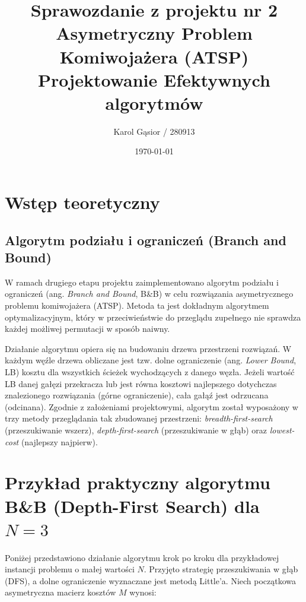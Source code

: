 \documentclass[12pt, a4paper]{article}
\title{\textbf{Sprawozdanie z projektu nr 2} \\ \large Asymetryczny Problem Komiwojażera (ATSP)
	\\ \large Projektowanie Efektywnych algorytmów}
\author{Karol Gąsior / 280913}
\date{\today}
\begin{document}
	
	\maketitle %
	\newpage
	\tableofcontents %
	\newpage
	
	\section{Wstęp teoretyczny}
	
	\subsection{Algorytm podziału i ograniczeń (Branch and Bound)}
	W ramach drugiego etapu projektu zaimplementowano algorytm podziału i ograniczeń (ang. \textit{Branch and Bound}, B\&B) w celu rozwiązania asymetrycznego problemu komiwojażera (ATSP). Metoda ta jest dokładnym algorytmem optymalizacyjnym, który w przeciwieństwie do przeglądu zupełnego nie sprawdza każdej możliwej permutacji w sposób naiwny. 
	
	Działanie algorytmu opiera się na budowaniu drzewa przestrzeni rozwiązań. W każdym węźle drzewa obliczane jest tzw. dolne ograniczenie (ang. \textit{Lower Bound}, LB) kosztu dla wszystkich ścieżek wychodzących z danego węzła. Jeżeli wartość LB danej gałęzi przekracza lub jest równa kosztowi najlepszego dotychczas znalezionego rozwiązania (górne ograniczenie), cała gałąź jest odrzucana (odcinana). Zgodnie z założeniami projektowymi, algorytm został wyposażony w trzy metody przeglądania tak zbudowanej przestrzeni: \textit{breadth-first-search} (przeszukiwanie wszerz), \textit{depth-first-search} (przeszukiwanie w głąb) oraz \textit{lowest-cost} (najlepszy najpierw).
	
	
	\section{Przykład praktyczny algorytmu B\&B (Depth-First Search) dla $N=3$}
	
	Poniżej przedstawiono działanie algorytmu krok po kroku dla przykładowej instancji problemu o małej wartości $N$. Przyjęto strategię przeszukiwania w głąb (DFS), a dolne ograniczenie wyznaczane jest metodą Little'a. Niech początkowa asymetryczna macierz kosztów $M$ wynosi:
	
\end{document}

